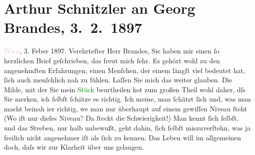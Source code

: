 

               \section[Arthur Schnitzler an Georg Brandes, 3. 2. 1897]{ Arthur Schnitzler an Georg Brandes, 3. 2. 1897}\nopagebreak{}\rehead{ }\normalsize\beginnumbering{} \toendnotes[C]{\smallbreak\pagebreak[2]} 
\toendnotes[C]{\smallbreak}\pstart
           \raggedleft{}{\pb}\textcolor{pink}{Wien}{}\ledrightnote{\textcolor{pink}{Wien}}, 3. Feber 1897.\pend
           \pstart{}Verehrteſter Herr Brandes,\pend\pstart
           Sie haben mir einen ſo herzlichen Brief geſchrieben, das freut mich ſehr. Es gehört
               wohl zu den angenehmſten Erfahrungen, einen Menſchen, der einem längſt viel bedeutet
               hat, ſich auch menſchlich nah zu fühlen. Laſſen Sie mich das weiter glauben.\pend
           \pstart
           Die Milde, mit der Sie mein \textcolor{green}{Stück}{}
               beurtheilen ko{\geminationm}t zum großen Theil wohl daher, dſs Sie
               merken, ich ſelbſt ſchätze es richtig. {\pb}Ich meine,
               man ſchätzt ſich und, was man macht beinah i{\geminationm}er richtig,
                  we{\geminationn} man nur überhaupt auf einem gewiſſen Niveau ſteht
               (Wo iſt nur dieſes Niveau? Da ſteckt die Schwierigkeit!) Man kennt ſich ſelbſt, und
               das Streben, nur halb unbewußt, geht dahin, ſich \introOben{}ſelbſt\introOben{}
               miszuverſtehn, was ja freilich nicht angenehmer iſt als ſich zu kennen. Das Leben
               will im allgemeinen doch, daſs wir zur Klarheit über uns gelangen.\pend
